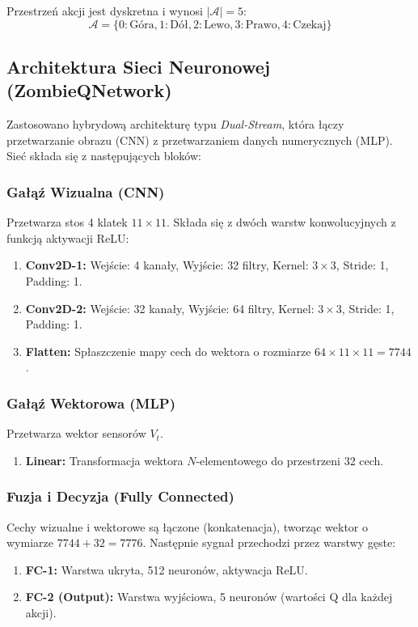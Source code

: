 \documentclass[12pt,a4paper]{article}
\begin{document}
Przestrzeń akcji jest dyskretna i wynosi $|\mathcal{A}| = 5$:
\begin{equation}
	\mathcal{A} = \{0: \text{Góra}, 1: \text{Dół}, 2: \text{Lewo}, 3: \text{Prawo}, 4: \text{Czekaj}\}
\end{equation}

\subsection{Architektura Sieci Neuronowej (ZombieQNetwork)}

Zastosowano hybrydową architekturę typu \textit{Dual-Stream}, która łączy
przetwarzanie obrazu (CNN) z przetwarzaniem danych numerycznych (MLP). Sieć
składa się z następujących bloków:

\subsubsection{Gałąź Wizualna (CNN)}
Przetwarza stos 4 klatek $11 \times 11$. Składa się z dwóch warstw
konwolucyjnych z funkcją aktywacji ReLU:
\begin{enumerate}
	\item \textbf{Conv2D-1:} Wejście: 4 kanały, Wyjście: 32 filtry, Kernel: $3 \times 3$, Stride: 1, Padding: 1.
	\item \textbf{Conv2D-2:} Wejście: 32 kanały, Wyjście: 64 filtry, Kernel: $3 \times 3$, Stride: 1, Padding: 1.
	\item \textbf{Flatten:} Spłaszczenie mapy cech do wektora o rozmiarze $64 \times 11 \times 11 = 7744$.
\end{enumerate}

\subsubsection{Gałąź Wektorowa (MLP)}
Przetwarza wektor sensorów $V_t$.
\begin{enumerate}
	\item \textbf{Linear:} Transformacja wektora $N$-elementowego do przestrzeni 32 cech.
\end{enumerate}

\subsubsection{Fuzja i Decyzja (Fully Connected)}
Cechy wizualne i wektorowe są łączone (konkatenacja), tworząc wektor o wymiarze
$7744 + 32 = 7776$. Następnie sygnał przechodzi przez warstwy gęste:
\begin{enumerate}
	\item \textbf{FC-1:} Warstwa ukryta, 512 neuronów, aktywacja ReLU.
	\item \textbf{FC-2 (Output):} Warstwa wyjściowa, 5 neuronów (wartości Q dla każdej akcji).
\end{enumerate}
\end{document}
